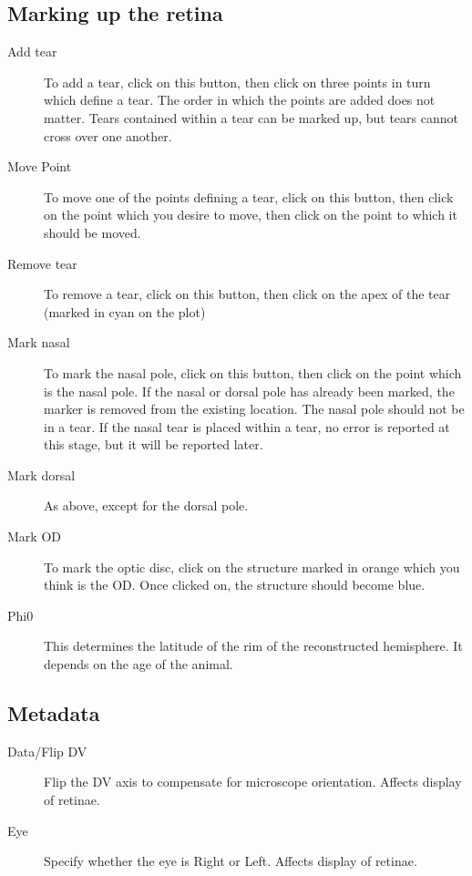\documentclass{article}
\begin{document}
\subsection{Marking up the retina}
\label{manual:sec:opening-files-retina}

\begin{description}
\item[Add tear] To add a tear, click on this button, then click on
  three points in turn which define a tear. The order in which the
  points are added does not matter. Tears contained within a tear can
  be marked up, but tears cannot cross over one another.
\item[Move Point] To move one of the points defining a tear, click on
  this button, then click on the point which you desire to move, then
  click on the point to which it should be moved.
\item[Remove tear] To remove a tear, click on this button, then click
  on the apex of the tear (marked in cyan on the plot)
\item[Mark nasal] To mark the nasal pole, click on this button, then
  click on the point which is the nasal pole.  If the nasal or
  dorsal pole has already been marked, the marker is removed from
  the existing location. The nasal pole should not be in a tear. If
  the nasal tear is placed within a tear, no error is reported at this
  stage, but it will be reported later.
\item[Mark dorsal] As above, except for the dorsal pole.
\item[Mark OD] To mark the optic disc, click on the structure marked
  in orange which you think is the OD. Once clicked on, the structure
  should become blue.
\item[Phi0] This determines the latitude of the rim of the
  reconstructed hemisphere. It depends on the age of the animal.
\end{description}

\subsection{Metadata}
\label{retistruct-manual:sec:metadata}

\begin{description}
\item[Data/Flip DV] Flip the DV axis to compensate for microscope
  orientation. Affects display of retinae.
\item[Eye] Specify whether the eye is Right or Left.  Affects display
  of retinae.
\end{description}
\end{document}

